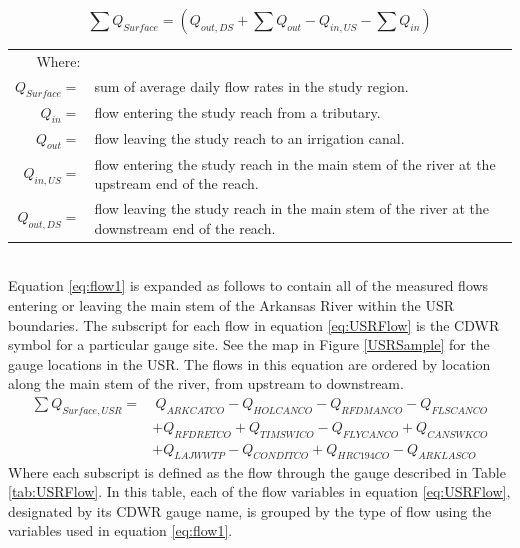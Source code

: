 \begin{linenumbers}
\begin{equation}
\label{eq:flow1}
\sum Q_{Surface} = \left( Q_{out,DS} + \sum Q_{out} - Q_{in,US} - \sum Q_{in} \right) 
\end{equation}
\begin{tabular}{r p{5.5in}}
	Where: & \\
	$ Q_{Surface} = $ & sum of average daily flow rates in the study region.\\
	$ Q_{in} = $ & flow entering the study reach from a tributary.\\
	$ Q_{out} = $ & flow leaving the study reach to an irrigation canal.\\
	$ Q_{in,US} = $ & flow entering the study reach in the main stem of the river at the upstream end of the reach.\\
	$ Q_{out,DS} = $ & flow leaving the study reach in the main stem of the river at the downstream end of the reach.\\
\end{tabular}\\

Equation \ref{eq:flow1} is expanded as follows to contain all of the measured flows entering or leaving the main stem of the Arkansas River within the USR boundaries.  The subscript for each flow in equation \ref{eq:USRFlow} is the CDWR symbol for a particular gauge site.  See the map in Figure \ref{USRSample} for the gauge locations in the USR.  The flows in this equation are ordered by location along the main stem of the river, from upstream to downstream.
\begin{align}
	\label{eq:USRFlow}
	\sum Q_{Surface,USR} = &~Q_{ARKCATCO} - Q_{HOLCANCO} - Q_{RFDMANCO} - Q_{FLSCANCO} \\
	\nonumber & + Q_{RFDRETCO} + Q_{TIMSWICO} - Q_{FLYCANCO} + Q_{CANSWKCO} \\ 
	\nonumber & + Q_{LAJWWTP} - Q_{CONDITCO} + Q_{HRC194CO} - Q_{ARKLASCO}
\end{align}
Where each subscript is defined as the flow through the gauge described in Table \ref{tab:USRFlow}.  In this table, each of the flow variables in equation \ref{eq:USRFlow}, designated by its CDWR gauge name, is grouped by the type of flow using the variables used in equation \ref{eq:flow1}.


\end{linenumbers}
